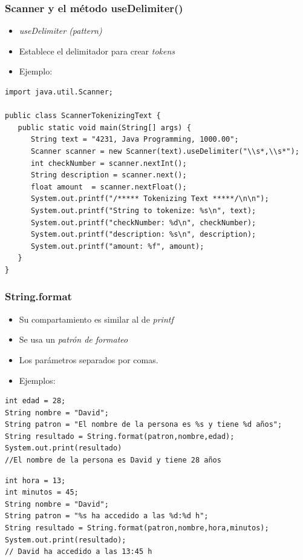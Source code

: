 \documentclass{beamer}
\begin{document}
\begin{frame}[fragile]
\frametitle{Scanner y el método useDelimiter()}
\begin{itemize}[<+->]
\item \emph{useDelimiter (pattern)}
\item Establece el delimitador para crear \emph{tokens}
\item Ejemplo:
\end{itemize}
\pause
\begin{footnotesize}
\begin{verbatim}
import java.util.Scanner;

public class ScannerTokenizingText {
   public static void main(String[] args) {
      String text = "4231, Java Programming, 1000.00";
      Scanner scanner = new Scanner(text).useDelimiter("\\s*,\\s*");
      int checkNumber = scanner.nextInt();
      String description = scanner.next();
      float amount  = scanner.nextFloat();
      System.out.printf("/***** Tokenizing Text *****/\n\n");
      System.out.printf("String to tokenize: %s\n", text);
      System.out.printf("checkNumber: %d\n", checkNumber);
      System.out.printf("description: %s\n", description);
      System.out.printf("amount: %f", amount);
   }
}
\end{verbatim}
\end{footnotesize}
\end{frame}

\begin{frame}[fragile]
\frametitle{String.format}
\begin{itemize}[<+->]
\item Su compartamiento es similar al de \emph{printf}
\item Se usa un \emph{patrón de formateo}
\item Los parámetros separados por comas.
\item Ejemplos:
\end{itemize}
\pause
\begin{footnotesize}
\begin{verbatim}
int edad = 28;
String nombre = "David";
String patron = "El nombre de la persona es %s y tiene %d años";
String resultado = String.format(patron,nombre,edad);
System.out.print(resultado)  
//El nombre de la persona es David y tiene 28 años
\end{verbatim}
\pause
\begin{verbatim}
int hora = 13;
int minutos = 45;
String nombre = "David";
String patron = "%s ha accedido a las %d:%d h";
String resultado = String.format(patron,nombre,hora,minutos);
System.out.print(resultado);
// David ha accedido a las 13:45 h
\end{verbatim}
\end{footnotesize}
\end{frame}
\end{document}
